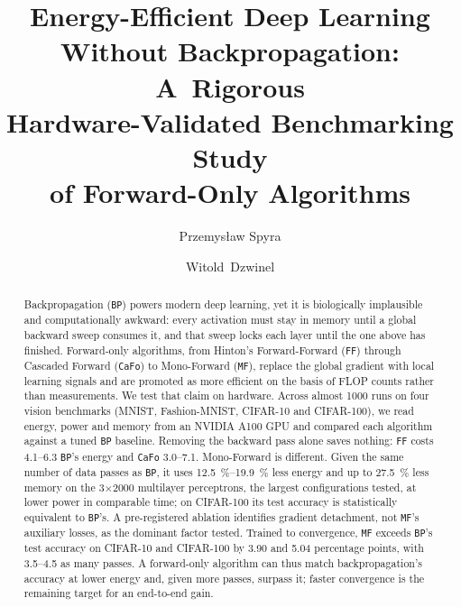 \documentclass{llncs}
\title{Energy-Efficient Deep Learning\\ Without Backpropagation: A~Rigorous\\
Hardware-Validated Benchmarking Study\\ of Forward-Only Algorithms}
\author{Przemys{\l}aw Spyra\orcidID{0009-0009-3001-2604} \and
Witold~Dzwinel\orcidID{0000-0001-8321-5928}}
\institute{AGH University of Krakow, Faculty of Computer Science,
Krak\'ow, Poland\\
\email{pspyra@agh.edu.pl, dzwinel@agh.edu.pl}}
\newcommand{\FF}{\texttt{FF}}
\newcommand{\MF}{\texttt{MF}}
\newcommand{\BP}{\texttt{BP}}
\newcommand{\CaFo}{\texttt{CaFo}}
\begin{document}
\maketitle

\begin{abstract}
Backpropagation (\BP{}) powers modern deep learning, yet it is biologically
implausible and computationally awkward: every activation must stay in memory
until a global backward sweep consumes it, and that sweep locks each layer
until the one above has finished. Forward-only algorithms, from Hinton's
Forward-Forward (\FF{}) through Cascaded Forward (\CaFo{}) to Mono-Forward
(\MF{}), replace the global gradient with local learning signals and are promoted as
more efficient on the basis of FLOP counts rather than measurements. We test that claim on hardware. Across almost \num{1000} runs on four
vision benchmarks (MNIST, Fashion-MNIST, CIFAR-10 and CIFAR-100), we read energy, power and memory from an NVIDIA
A100 GPU and compared each algorithm against a tuned \BP{} baseline. Removing
the backward pass alone saves nothing: \FF{} costs \SIrange{4.1}{6.3}{\times}
\BP{}'s energy and \CaFo{} \SIrange{3.0}{7.1}{\times}. Mono-Forward is different. Given the same number of data passes
as \BP{}, it uses \SIrange{12.5}{19.9}{\percent} less energy and up to
\SI{27.5}{\percent} less memory on the \num{3}$\times$\num{2000} multilayer perceptrons, the
largest configurations tested, at lower power in comparable time; on
CIFAR-100 its test accuracy is statistically equivalent to \BP{}'s. A
pre-registered ablation identifies gradient detachment, not \MF{}'s auxiliary
losses, as the dominant factor tested. Trained to convergence, \MF{} exceeds
\BP{}'s test accuracy on CIFAR-10 and CIFAR-100 by \num{3.90} and
\num{5.04} percentage points, with \SIrange{3.5}{4.5}{\times} as many passes. A
forward-only algorithm can thus match backpropagation's accuracy at lower
energy and, given more passes, surpass it; faster convergence is the remaining target
for an end-to-end gain.

\end{abstract}
\end{document}
